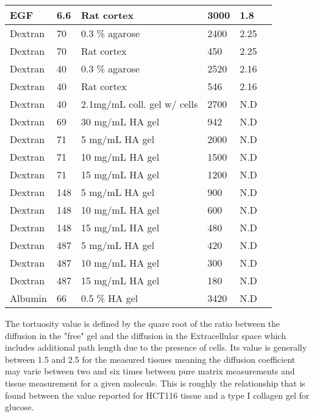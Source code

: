 \documentclass[11pt,a4paper]{article}
\begin{document}
\begin{center}
\begin{tabular}{ |p{18mm}|p{18mm}|p{28mm}|p{19mm}|p{15mm}|p{10mm}| }
 \hline
 EGF & 6.6 & Rat cortex & 3000 & 1.8 & \cite{Thorne2005}\\
 \hline
 Dextran & 70 & 0.3 \% agarose & 2400 & 2.25 & \cite{Nicholson1994}\\ 
 \hline
 Dextran & 70 & Rat cortex & 450  & 2.25 & \cite{Nicholson1994}\\
 \hline
 Dextran & 40 & 0.3 \% agarose & 2520 & 2.16 & \cite{Nicholson1994}\\
 \hline
 Dextran & 40 & Rat cortex & 546 & 2.16 & \cite{Nicholson1994}\\
 \hline
 Dextran & 40 & 2.1mg/mL coll. gel w/ cells & 2700 & N.D & \cite{Kihara2013} \\
 \hline
  Dextran & 69 & 30 mg/mL HA gel & 942 & N.D & \cite{Shenoy1995} \\
 \hline
   Dextran & 71 & 5 mg/mL HA gel & 2000 & N.D & \cite{DeSmedt1994} \\
 \hline
    Dextran & 71 & 10 mg/mL HA gel & 1500 & N.D & \cite{DeSmedt1994} \\
 \hline
   Dextran & 71 & 15 mg/mL HA gel & 1200 & N.D & \cite{DeSmedt1994} \\
 \hline
   Dextran & 148 & 5 mg/mL HA gel & 900 & N.D & \cite{DeSmedt1994} \\
 \hline
    Dextran & 148 & 10 mg/mL HA gel & 600 & N.D & \cite{DeSmedt1994} \\
 \hline
   Dextran & 148 & 15 mg/mL HA gel & 480 & N.D & \cite{DeSmedt1994} \\
 \hline
    Dextran & 487 & 5 mg/mL HA gel & 420 & N.D & \cite{DeSmedt1994} \\
 \hline
    Dextran & 487 & 10 mg/mL HA gel & 300 & N.D & \cite{DeSmedt1994} \\
 \hline
   Dextran & 487 & 15 mg/mL HA gel & 180 & N.D & \cite{DeSmedt1994} \\
 \hline
   Albumin & 66 & 0.5 \% HA gel & 3420 & N.D & \cite{Winlove1984} \\
 \hline
\end{tabular}
\end{center}

The tortuosity value is defined by the quare root of the ratio between the diffusion in the "free" gel and the diffusion in the Extracellular space which includes additional path length due to the presence of cells.\cite{Nicholson1994} Its value is generally between 1.5 and 2.5 for the measured tissues meaning the diffusion coefficient may varie between two and six times between pure matrix measurements and tissue measurement for a given molecule. This is roughly the relationship that is found between the value reported for HCT116 tissue and a type I collagen gel for glucose.
\end{document}
